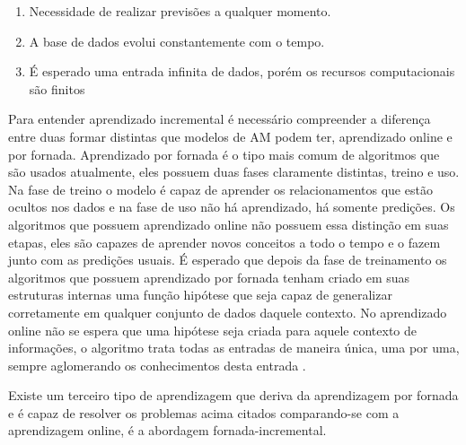 \begin{enumerate}
\item Necessidade de realizar previsões a qualquer momento.
\item A base de dados evolui constantemente com o tempo.
\item É esperado uma entrada infinita de dados, porém os recursos computacionais são finitos
\end{enumerate}

Para entender aprendizado incremental é necessário compreender a diferença entre duas formar distintas que modelos de AM podem ter, aprendizado online e por fornada. Aprendizado por fornada é o tipo mais comum de algoritmos que são usados atualmente, eles possuem duas fases claramente distintas, treino e uso. Na fase de treino o modelo é capaz de aprender os relacionamentos que estão ocultos nos dados e na fase de uso não há aprendizado, há somente predições. Os algoritmos que possuem aprendizado online não possuem essa distinção em suas etapas, eles são capazes de aprender novos conceitos a todo o tempo e o fazem junto com as predições usuais. É esperado que depois da fase de treinamento os algoritmos que possuem aprendizado por fornada tenham criado em suas estruturas internas uma função hipótese que seja capaz de generalizar corretamente em qualquer conjunto de dados daquele contexto. No aprendizado online não se espera que uma hipótese seja criada para aquele contexto de informações, o algoritmo trata todas as entradas de maneira única, uma por uma, sempre aglomerando os conhecimentos desta entrada \cite{from2009}. 

Existe um terceiro tipo de aprendizagem que deriva da aprendizagem por fornada e é capaz de resolver os problemas acima citados comparando-se com a aprendizagem online, é a abordagem fornada-incremental.  

 

